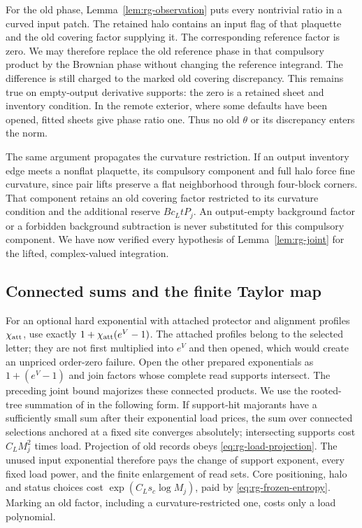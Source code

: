 For the old phase, Lemma~\ref{lem:rg-observation} puts every nontrivial
ratio in a curved input patch.  The retained halo contains an input
flag of that plaquette and the old covering factor supplying it.  The
corresponding reference factor is zero.  We may therefore replace the
old reference phase in that compulsory product by the Brownian phase
without changing the reference integrand.  The difference is still
charged to the marked old covering discrepancy.  This remains true on
empty-output derivative supports: the zero is a retained sheet and
inventory condition.  In the remote exterior, where some defaults have
been opened, fitted sheets give phase ratio one.  Thus no old $\theta$
or its discrepancy enters the norm.

The same argument propagates the curvature restriction.  If an output
inventory edge meets a nonflat plaquette, its compulsory component and
full halo force fine curvature, since pair lifts preserve a flat
neighborhood through four-block corners.  That component retains an
old covering factor restricted to its curvature condition and the
additional reserve $Bc_LtP_j$.  An output-empty background factor or a
forbidden background subtraction is never substituted for this
compulsory component.  We have now verified every hypothesis of
Lemma~\ref{lem:rg-joint} for the lifted, complex-valued integration.

\subsection{Connected sums and the finite Taylor map}

For an optional hard exponential with attached protector and alignment
profiles $\chi_{\rm att}$, use exactly
$1+\chi_{\rm att}(e^V-1)$.  The attached profiles belong to the
selected letter; they are not first multiplied into $e^V$ and then
opened, which would create an unpriced order-zero failure.
Open the other prepared exponentials as $1+(e^V-1)$ and join factors
whose complete read supports intersect.  The preceding joint bound
majorizes these connected products.  We use the rooted-tree summation
of \cite[Section ``Connected sums and exact reassembly'', tree
condition and exact background-exclusion identity]{SharpO4} in the
following form.  If support-hit majorants have a sufficiently small
sum after their exponential load prices, the sum over connected
selections anchored at a fixed site converges absolutely; intersecting
supports cost $C_LM_j^2$ times load.  Projection of old records obeys
\eqref{eq:rg-load-projection}.  The unused input exponential therefore
pays the change of support exponent, every fixed load power, and the
finite enlargement of read sets.  Core positioning, halo and status
choices cost $\exp(C_Ls_c\log M_j)$, paid by
\eqref{eq:rg-frozen-entropy}.  Marking an old factor, including a
curvature-restricted one, costs only a load polynomial.

